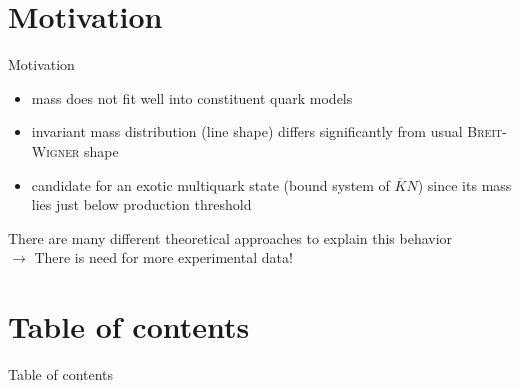 \documentclass[11pt,aspectratio=1610,dvipsnames]{beamer}
\begin{document}
\section*{Motivation}
\begin{frame}{Motivation}
\begin{minipage}{\linewidth}
		\begin{tcolorbox}[colback=black!10,colframe=gray!20!black,title=What is special about the $\Lambda(1405)$?] 
			\begin{itemize}
				\item mass does not fit well into constituent quark models 
				\item invariant mass distribution (line shape) differs significantly from usual \textsc{Breit-Wigner} shape
				\item candidate for an exotic multiquark state (bound system of $\overline{K}N$) since its mass lies just below production threshold
			
 			\end{itemize}
 		\vspace{.5cm}
 		There are  many different theoretical approaches to explain this behavior\\
 		$\to$ There is need for more experimental data!
		\end{tcolorbox}

\end{minipage}




	
\end{frame}
\section*{Table of contents}
\begin{frame}{Table of contents}
	\tableofcontents
\end{frame}
\end{document}
